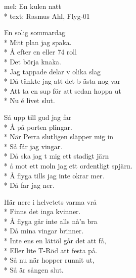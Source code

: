 \begin{SongText}
    \begin{SongInfo}
        mel: En kulen natt\\*%
        text: Rasmus Ahl, Flyg-01
    \end{SongInfo}
    \begin{SongVerse}
        En solig sommardag\\*%
        Mitt plan jag spaka.\\*%
        Å efter en eller 74 roll\\*%
        Det börja knaka.\\*%
        Jag tappade delar v olika slag\\*%
        Då tänkte jag att det b ästa nog var\\*%
        Att ta en sup för att sedan hoppa ut\\*%
        Nu é livet slut.
    \end{SongVerse}
    \begin{SongVerse}
        Så upp till gud jag far\\*%
        Å på porten plingar.\\*%
        När Perra slutligen släpper mig in\\*%
        Så får jag vingar.\\*%
        Då ska jag t mig ett stadigt järn\\*%
        å mot ett moln jag ett ordentligt spjärn.\\*%
        Å flyga tills jag inte okrar mer.\\*%
        Då far jag ner.
    \end{SongVerse}
    \begin{SongVerse}
        Här nere i helvetets varma vrå\\*%
        Finns det inga kvinner.\\*%
        Å flyga går inte alls nå'n bra\\*%
        Då mina vingar brinner.\\*%
        Inte ens en lättöl går det att få,\\*%
        Eller lite T-Röd att festa på.\\*%
        Så nu när hopper runnit ut,\\*%
        Så är sången slut.
    \end{SongVerse}
\end{SongText}
